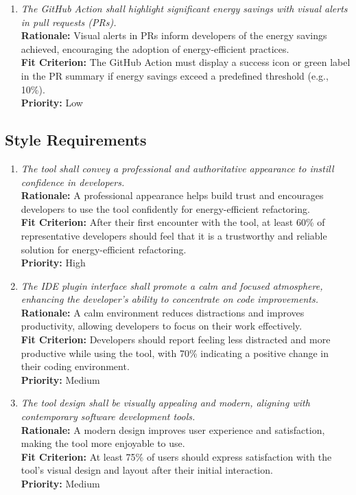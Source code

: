 \documentclass[12pt]{article}
\begin{document}
\begin{enumerate}[label=LFR-AP \arabic*., wide=0pt, leftmargin=*]
    {\bf Fit Criterion:} The tool should prominently display only the code, refactoring suggestions, and energy metrics, omitting unnecessary visual elements or distractions.\\
    {\bf Priority:} Low
    \item \emph{The GitHub Action shall highlight significant energy savings with visual alerts in pull requests (PRs).}\\
    {\bf Rationale:} Visual alerts in PRs inform developers of the energy savings achieved, encouraging the adoption of energy-efficient practices.\\
    {\bf Fit Criterion:} The GitHub Action must display a success icon or green label in the PR summary if energy savings exceed a predefined threshold (e.g., 10\%).\\
    {\bf Priority:} Low
\end{enumerate}
\subsection{Style Requirements}
\begin{enumerate}[label=LFR-ST \arabic*., wide=0pt, leftmargin=*]
    \item \emph{The tool shall convey a professional and authoritative appearance to instill confidence in developers.}\\
    {\bf Rationale:} A professional appearance helps build trust and encourages developers to use the tool confidently for energy-efficient refactoring.\\
    {\bf Fit Criterion:} After their first encounter with the tool, at least 60\% of representative developers should feel that it is a trustworthy and reliable solution for energy-efficient refactoring.\\
    {\bf Priority:} High
    \item \emph{The IDE plugin interface shall promote a calm and focused atmosphere, enhancing the developer's ability to concentrate on code improvements.}\\
    {\bf Rationale:} A calm environment reduces distractions and improves productivity, allowing developers to focus on their work effectively.\\
    {\bf Fit Criterion:} Developers should report feeling less distracted and more productive while using the tool, with 70\% indicating a positive change in their coding environment.\\
    {\bf Priority:} Medium
    \item \emph{The tool design shall be visually appealing and modern, aligning with contemporary software development tools.}\\
    {\bf Rationale:} A modern design improves user experience and satisfaction, making the tool more enjoyable to use.\\
    {\bf Fit Criterion:} At least 75\% of users should express satisfaction with the tool's visual design and layout after their initial interaction.\\
    {\bf Priority:} Medium
\end{enumerate}
\end{document}
